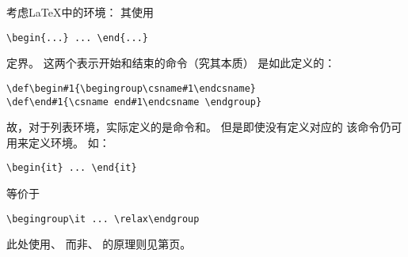 \documentclass{book}
\begin{document}
考虑{\LaTeX}中的环境：
其使用
\begin{verbatim}
\begin{...} ... \end{...}
\end{verbatim}
定界。
这两个表示开始和结束的命令（究其本质）
是如此定义的：
\begin{verbatim}
\def\begin#1{\begingroup\csname#1\endcsname}
\def\end#1{\csname end#1\endcsname \endgroup}
\end{verbatim}
故，对于列表环境，实际定义的是命令和。
但是即使没有定义对应的
该命令仍可用来定义环境。
如：
\begin{verbatim}
\begin{it} ... \end{it}
\end{verbatim}
等价于
\begin{verbatim}
\begingroup\it ... \relax\endgroup
\end{verbatim}
此处使用、
而非、
的原理则见第\pageref{begin:end:macros}页。

\end{document}
